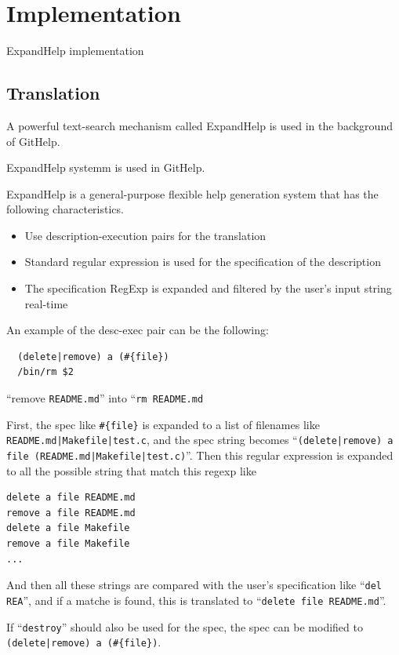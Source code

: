 \documentclass{sigchi}
\def\GH{\textsf{GitHelp}}
\def\EH{\textsf{ExpandHelp}}
\begin{document}
\section{Implementation}

{\EH} implementation

\subsection{Translation}

A powerful text-search mechanism called {\EH} is used in the
background of {\GH}.

{\EH} systemm is used in {\GH}.

{\EH} is a general-purpose flexible help generation system
that has the following characteristics.

\begin{itemize}
\item Use description-execution pairs for the translation
\item Standard regular expression is used for the specification of the description
\item The specification RegExp is expanded and filtered by the user's input string
  real-time
\end{itemize}

An example of the desc-exec pair can be the following:

\begin{verbatim}
  (delete|remove) a (#{file})
  /bin/rm $2
\end{verbatim}

``remove \verb|README.md|''
into
``\verb|rm README.md|

First, the spec like \verb|#{file}| is expanded to a list of filenames like
\verb+README.md|Makefile|test.c+,
and the spec string becomes
``\verb+(delete|remove) a file (README.md|Makefile|test.c)+''.
Then this regular expression is expanded to all the possible string that match this regexp like
\begin{verbatim}
delete a file README.md
remove a file README.md
delete a file Makefile
remove a file Makefile
...
\end{verbatim}

And then all these strings are compared with the user's specification like
``\verb|del REA|'',
and if a matche is found,
this is translated to
``\verb|delete file README.md|''.

If ``\verb|destroy|'' should also be used for the spec,
the spec can be modified to 
\verb+(delete|remove) a (#{file})+.
\end{document}
